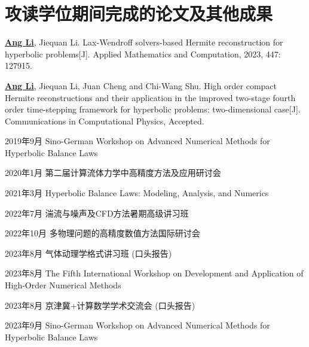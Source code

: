 \chapter{攻读\cxuewei 学位期间完成的论文及其他成果}


\begin{list}{[]}
  {
    \setlength{\leftmargin}{2.5em}
    \setlength{\labelsep}{1em}
  }
  \item \underline{\bfseries Ang Li}, Jiequan Li. Lax-Wendroff solvers-based Hermite reconstruction for hyperbolic problems[J]. Applied Mathematics and Computation, 2023, 447: 127915.
  \item \underline{\bfseries Ang Li}, Jiequan Li, Juan Cheng and Chi-Wang Shu. High order compact Hermite reconstructions and their application in the improved two-stage fourth order time-stepping framework for hyperbolic problems: two-dimensional case[J]. Communications in Computational Physics, Accepted.
\end{list}

\begin{list}{[]}
  {
    \setlength{\leftmargin}{2.5em}
    \setlength{\labelsep}{1em}
  }
  \item 2019年9月 Sino-German Workshop on Advanced Numerical Methods for Hyperbolic Balance Laws
  \item 2020年1月 第二届计算流体力学中高精度方法及应用研讨会
  \item 2021年3月 Hyperbolic Balance Laws: Modeling, Analysis, and Numerics
  \item 2022年7月 湍流与噪声及CFD方法暑期高级讲习班
  \item 2022年10月 多物理问题的高精度数值方法国际研讨会
  \item 2023年8月 气体动理学格式讲习班 (口头报告)
  \item 2023年8月 The Fifth International Workshop on Development and Application of High-Order Numerical Methods
  \item 2023年8月 京津冀+计算数学学术交流会 (口头报告)
  \item 2023年9月 Sino-German Workshop on Advanced Numerical Methods for Hyperbolic Balance Laws
\end{list}